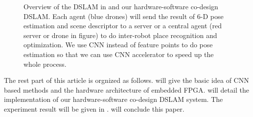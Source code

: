 \begin{figure}[thb]
    \begin{minipage}[t]{0.5\linewidth}  
    \centering
    \end{minipage}
    \begin{minipage}[t]{0.5\linewidth}  
    \centering  
    \end{minipage}
    \caption{Overview of the DSLAM in \cite{Cieslewski:20187ee} and our hardware-software co-design DSLAM. Each agent (blue drones) will send the result of 6-D pose estimation and scene descriptor to a server or a central agent (red server or drone in figure) to do inter-robot place recognition and optimization. We use CNN instead of feature points to do pose estimation so that we can use CNN accelerator to speed up the whole process.}
    \label{fig:overview}
    \end{figure}

The rest part of this article is orgnized as follows.  will give the basic idea of CNN based methods and the hardware architecture of embedded FPGA.  will detail the implementation of our hardware-software co-design DSLAM system. The experiment result will be given in .  will conclude this paper.